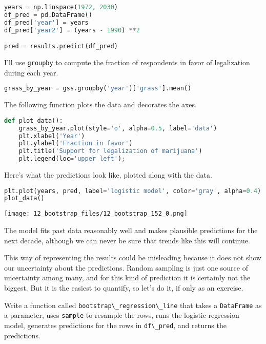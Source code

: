 \begin{lstlisting}[language=Python,style=source]
years = np.linspace(1972, 2030)
df_pred = pd.DataFrame()
df_pred['year'] = years
df_pred['year2'] = (years - 1990) **2

pred = results.predict(df_pred)
\end{lstlisting}

I'll use \passthrough{\lstinline!groupby!} to compute the fraction of
respondents in favor of legalization during each year.

\begin{lstlisting}[language=Python,style=source]
grass_by_year = gss.groupby('year')['grass'].mean()
\end{lstlisting}

The following function plots the data and decorates the axes.

\begin{lstlisting}[language=Python,style=source]
def plot_data():
    grass_by_year.plot(style='o', alpha=0.5, label='data')
    plt.xlabel('Year')
    plt.ylabel('Fraction in favor')
    plt.title('Support for legalization of marijuana')
    plt.legend(loc='upper left');
\end{lstlisting}

Here's what the predictions look like, plotted along with the data.

\begin{lstlisting}[language=Python,style=source]
plt.plot(years, pred, label='logistic model', color='gray', alpha=0.4)
plot_data()
\end{lstlisting}

\begin{center}
\texttt{[image: 12\_bootstrap\_files/12\_bootstrap\_152\_0.png]}
\end{center}

The model fits past data reasonably well and makes plausible predictions
for the next decade, although we can never be sure that trends like this
will continue.

This way of representing the results could be misleading because it does
not show our uncertainty about the predictions. Random sampling is just
one source of uncertainty among many, and for this kind of prediction it
is certainly not the biggest. But it is the easiest to quantify, so
let's do it, if only as an exercise.

Write a function called
\passthrough{\lstinline!bootstrap\_regression\_line!} that takes a
\passthrough{\lstinline!DataFrame!} as a parameter, uses
\passthrough{\lstinline!sample!} to resample the rows, runs the logistic
regression model, generates predictions for the rows in
\passthrough{\lstinline!df\_pred!}, and returns the predictions.

